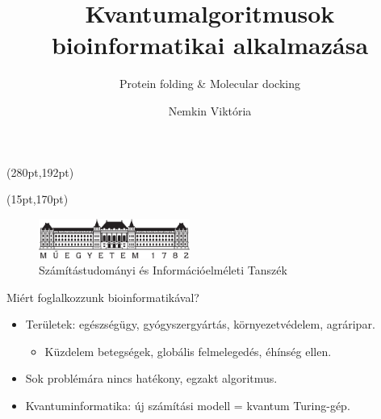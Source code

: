 \documentclass[aspectratio=169]{beamer}
\author[Nemkin Viktória, dr. Friedl Katalin]{Nemkin Viktória}
\institute[]{
\begin{small}Témavezető: dr. Friedl Katalin\end{small}
}
\title{Kvantumalgoritmusok bioinformatikai alkalmazása}
\subtitle{Protein folding \& Molecular docking}
\date{}
\begin{document}
\begin{frame}
\titlepage

\begin{textblock*}{150pt}(280pt,192pt) %

\end{textblock*}

\begin{textblock*}{180pt}(15pt,170pt) %
\begin{figure}[H]
\includegraphics[width=140pt]{./figures/bme_logo.pdf}
\caption{Számítástudományi és Információelméleti Tanszék}
\end{figure}

\end{textblock*}

\end{frame}

\begin{frame}{Miért foglalkozzunk bioinformatikával?}
\begin{itemize}
    \item Területek: egészségügy, gyógyszergyártás, környezetvédelem, agráripar.
    \begin{itemize}
        \item Küzdelem betegségek, globális felmelegedés, éhínség ellen.
    \end{itemize}
    \item Sok problémára nincs hatékony, egzakt algoritmus.
    \item Kvantuminformatika: új számítási modell = kvantum Turing-gép.
\end{itemize}
    
\end{frame}
\end{document}

